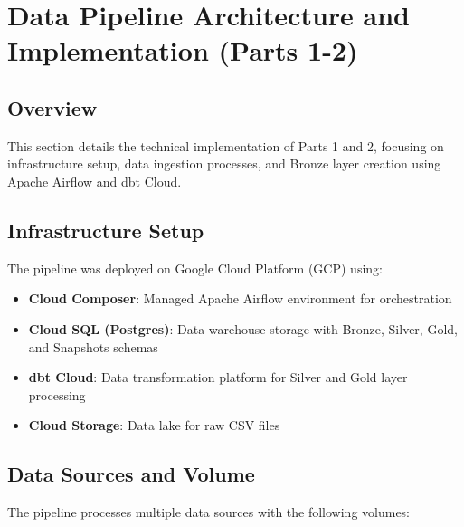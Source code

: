 \section{Data Pipeline Architecture and Implementation (Parts 1-2)}

\subsection{Overview}
This section details the technical implementation of Parts 1 and 2, focusing on infrastructure setup, data ingestion processes, and Bronze layer creation using Apache Airflow and dbt Cloud.



\subsection{Infrastructure Setup}
The pipeline was deployed on Google Cloud Platform (GCP) using:
\begin{itemize}
  \item \textbf{Cloud Composer}: Managed Apache Airflow environment for orchestration
  \item \textbf{Cloud SQL (Postgres)}: Data warehouse storage with Bronze, Silver, Gold, and Snapshots schemas
  \item \textbf{dbt Cloud}: Data transformation platform for Silver and Gold layer processing
  \item \textbf{Cloud Storage}: Data lake for raw CSV files
\end{itemize}

\subsection{Data Sources and Volume}
The pipeline processes multiple data sources with the following volumes:

